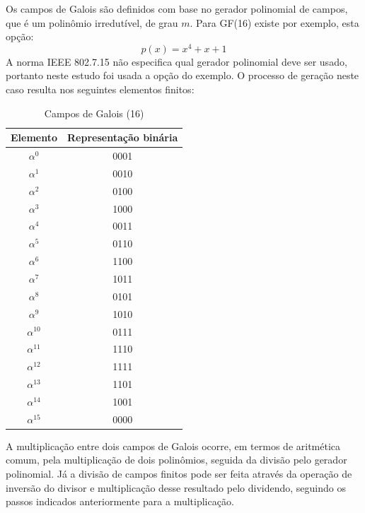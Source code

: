 	Os campos de Galois são definidos com base no gerador polinomial de campos, que é um polinômio irredutível, de grau $m$. Para GF(16) existe por exemplo, esta opção:
	\begin{equation}
	p(x) = x^{4} + x + 1 
	\end{equation}
	A norma IEEE 802.7.15 não especifica qual gerador polinomial deve ser usado, portanto neste estudo foi usada a opção do exemplo. O processo de geração neste caso resulta nos seguintes elementos finitos:
	\begin{table}[]
		\centering
		\caption{Campos de Galois (16)}
		\label{my-label}
		\begin{tabular}{|c|c|}
			\hline
			Elemento & Representação binária \\ \hline
			$\alpha^{0}$   & 0001                  \\ \hline
			$\alpha^{1}$   & 0010                  \\ \hline
			$\alpha^{2}$   & 0100                  \\ \hline
			$\alpha^{3}$   & 1000                  \\ \hline
			$\alpha^{4}$   & 0011                  \\ \hline
			$\alpha^{5}$   & 0110                  \\ \hline
			$\alpha^{6}$   & 1100                  \\ \hline
			$\alpha^{7}$   & 1011                  \\ \hline
			$\alpha^{8}$   & 0101                  \\ \hline
			$\alpha^{9}$   & 1010                  \\ \hline
			$\alpha^{10}$  & 0111                  \\ \hline
			$\alpha^{11}$  & 1110                  \\ \hline
			$\alpha^{12}$  & 1111                  \\ \hline
			$\alpha^{13}$  & 1101                  \\ \hline
			$\alpha^{14}$  & 1001                  \\ \hline
			$\alpha^{15}$  & 0000                  \\ \hline
		\end{tabular}
	\end{table}
	 
	A multiplicação entre dois campos de Galois ocorre, em termos de aritmética comum, pela multiplicação de dois polinômios, seguida da divisão pelo gerador polinomial. Já a divisão  de campos finitos pode ser feita através da operação de inversão do divisor e multiplicação desse resultado pelo dividendo, seguindo os passos indicados anteriormente para a multiplicação. 
	 
